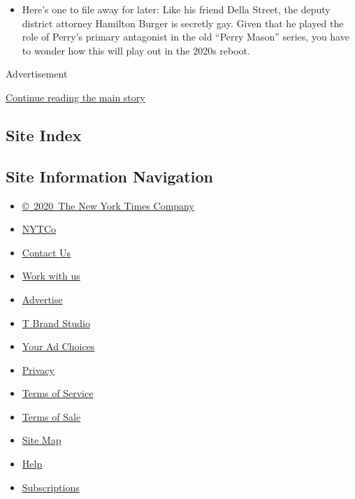 \begin{itemize}
\tightlist
\item
  Here's one to file away for later: Like his friend Della Street, the
  deputy district attorney Hamilton Burger is secretly gay. Given that
  he played the role of Perry's primary antagonist in the old ``Perry
  Mason'' series, you have to wonder how this will play out in the 2020s
  reboot.
\end{itemize}

Advertisement

\protect\hyperlink{after-bottom}{Continue reading the main story}

\hypertarget{site-index}{%
\subsection{Site Index}\label{site-index}}

\hypertarget{site-information-navigation}{%
\subsection{Site Information
Navigation}\label{site-information-navigation}}

\begin{itemize}
\tightlist
\item
  \href{https://help.nytimes3xbfgragh.onion/hc/en-us/articles/115014792127-Copyright-notice}{©~2020~The
  New York Times Company}
\end{itemize}

\begin{itemize}
\tightlist
\item
  \href{https://www.nytco.com/}{NYTCo}
\item
  \href{https://help.nytimes3xbfgragh.onion/hc/en-us/articles/115015385887-Contact-Us}{Contact
  Us}
\item
  \href{https://www.nytco.com/careers/}{Work with us}
\item
  \href{https://nytmediakit.com/}{Advertise}
\item
  \href{http://www.tbrandstudio.com/}{T Brand Studio}
\item
  \href{https://www.nytimes3xbfgragh.onion/privacy/cookie-policy\#how-do-i-manage-trackers}{Your
  Ad Choices}
\item
  \href{https://www.nytimes3xbfgragh.onion/privacy}{Privacy}
\item
  \href{https://help.nytimes3xbfgragh.onion/hc/en-us/articles/115014893428-Terms-of-service}{Terms
  of Service}
\item
  \href{https://help.nytimes3xbfgragh.onion/hc/en-us/articles/115014893968-Terms-of-sale}{Terms
  of Sale}
\item
  \href{https://spiderbites.nytimes3xbfgragh.onion}{Site Map}
\item
  \href{https://help.nytimes3xbfgragh.onion/hc/en-us}{Help}
\item
  \href{https://www.nytimes3xbfgragh.onion/subscription?campaignId=37WXW}{Subscriptions}
\end{itemize}
